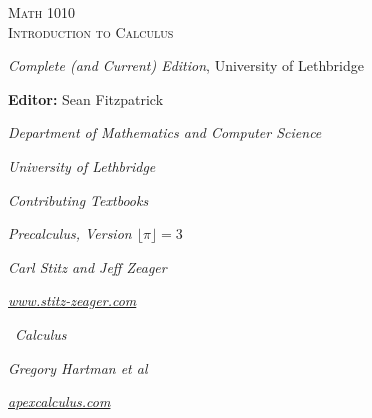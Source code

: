 
\hskip 125pt\begin{minipage}{\textwidth}
\begin{flushright}

\textsc{{\Huge Math 1010 \\
Introduction to Calculus}} \\

\bigskip

\textsl{\Large Complete (and Current) Edition}, 
{\Large University of Lethbridge}\\


\bigskip

\Large
\vspace{1in}

\textbf{Editor:} Sean Fitzpatrick

\emph{\large Department of Mathematics and Computer Science}

\emph{\large University of Lethbridge}\vskip15pt

\parbox{200pt}{\textit{Contributing Textbooks}}\hskip 2cm \phantom{.}

\vspace{0.5in}

\textit{Precalculus, Version $\lfloor \pi\rfloor = 3$}

\emph{\large Carl Stitz and Jeff Zeager}

\emph{\large \href{http://www.stitz-zeager.com}{www.stitz-zeager.com}}\vskip 15pt

\apex\ \textit{Calculus}

\emph{\large Gregory Hartman et al}

\emph{\large \href{http://www.apexcalculus.com}{apexcalculus.com}}\vskip 15pt


\normalsize
\end{flushright}
\end{minipage}

